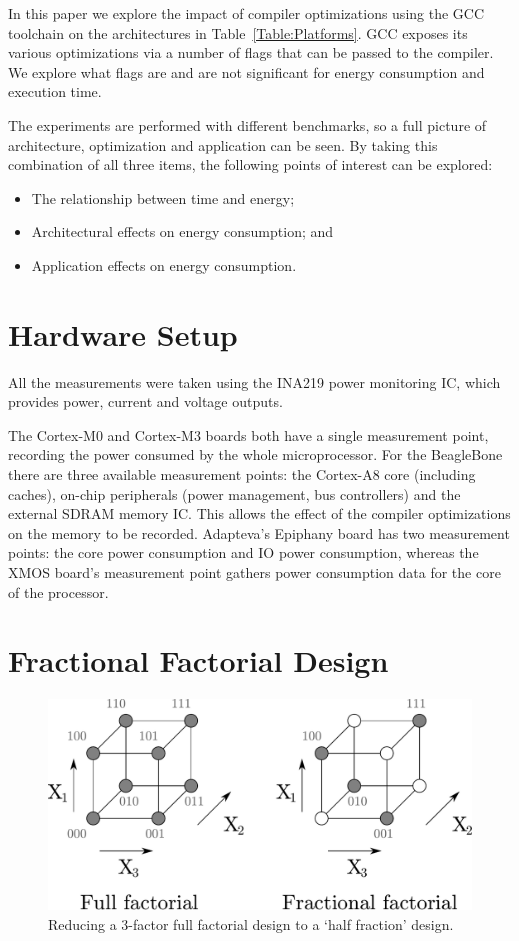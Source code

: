 \documentclass[twocolumn]{article}
\let\oldcaption\caption
\renewcommand{\caption}[1]{\oldcaption{\textup{#1}}}
\begin{document}
In this paper we explore the impact of compiler optimizations using the GCC toolchain on the architectures in Table~\ref{Table:Platforms}. GCC exposes its various optimizations via a number of flags that can be passed to the compiler. We explore what flags are and are not significant for energy consumption and execution time.

The experiments are performed with different benchmarks, so a full picture of architecture, optimization and application can be seen. By taking this combination of all three items, the following points of interest can be explored:
\begin{itemize}
	\setlength{\itemsep}{0em}
	\vspace{-1mm}
 	\item The relationship between time and energy;
 	\item Architectural effects on energy consumption; and
 	\item Application effects on energy consumption.
 \end{itemize}

\section{Hardware Setup}

All the measurements were taken using the INA219 power monitoring IC\cite{INA219}, which provides power, current and voltage outputs.

The Cortex-M0 and Cortex-M3 boards both have a single measurement point, recording the power consumed by the whole microprocessor. For the BeagleBone there are three available measurement points: the Cortex-A8 core (including caches), on-chip peripherals (power management, bus controllers) and the external SDRAM memory IC. This allows the effect of the compiler optimizations on the memory to be recorded. Adapteva's Epiphany board has two measurement points: the core power consumption and IO power consumption, whereas the XMOS board's measurement point gathers power consumption data for the core of the processor.

\section{Fractional Factorial Design}

\begin{figure}[bt]
	\centering
	\includegraphics[width=0.9\linewidth]{ffd.pdf}
	\caption{Reducing a 3-factor full factorial design to a `half fraction' design.}
	\label{Fig:FFDTut}
\end{figure}
\end{document}
